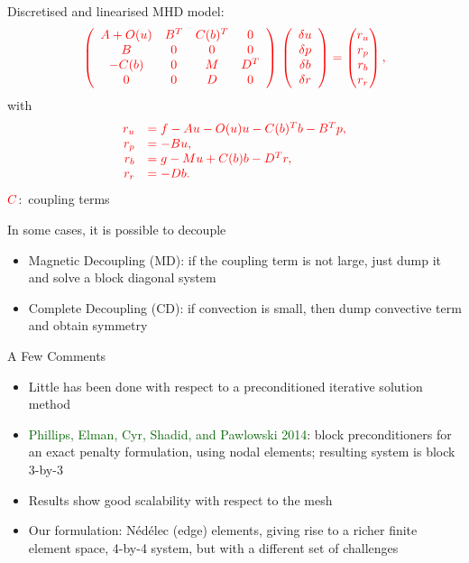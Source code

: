 \documentclass[12pt]{beamer}
\newcommand{\gr}[1]{\textcolor{darkgreen} {#1}}
\newcommand{\re}[1]{{\textcolor{red}       {#1}}}
\begin{document}
\begin{frame}
Discretised and linearised MHD model:
\begin{equation}
\nonumber %
\re{\left(
\begin{array}{cccc}
A+O(u) & B^T & C(b)^T & 0\\
B & 0 & 0 & 0 \\
-C(b) & 0 & M & D^T\\
0 & 0 & D & 0
\end{array}
\right)
\,
\left(
\begin{array}{c}
\delta u\\
\delta p\\
\delta b\\
\delta r
\end{array}
\right)  =
\begin{pmatrix}
r_u \\
r_p\\
r_b\\
r_r
\end{pmatrix},}
\end{equation}
with
\begin{equation}\nonumber
\re{\begin{array}{rl}
r_u &= f- Au -O(u) u - C(b)^T b- B^T p,\\
r_p &=-B u,\\
r_b &=g-Mu+C(b)b-D^T r,\\
r_r &=-D b.
\end{array}}
\end{equation}
$\re{C}$:~coupling terms

\vspace{2mm}
\pause
In some cases, it is possible to decouple
\begin{itemize}
\item Magnetic Decoupling (MD): if the coupling term is not large, just dump it and solve a block diagonal system
\item Complete Decoupling (CD): if convection is small, then dump convective term and obtain symmetry
\end{itemize}

  \end{frame}

\begin{frame}{A Few Comments}
\begin{itemize}
    \item Little has been done with respect to a preconditioned iterative solution method
    \item   \gr{Phillips, Elman, Cyr, Shadid, and Pawlowski 2014}: block preconditioners for an exact penalty formulation, using nodal elements; resulting system is block 3-by-3
    \item Results show good scalability with respect to the mesh
    \item Our formulation: {N\'{e}d\'{e}lec} (edge) elements, giving rise to a richer finite element space, 4-by-4 system, but with a different set of challenges
\end{itemize}


\end{frame}
\end{document}
